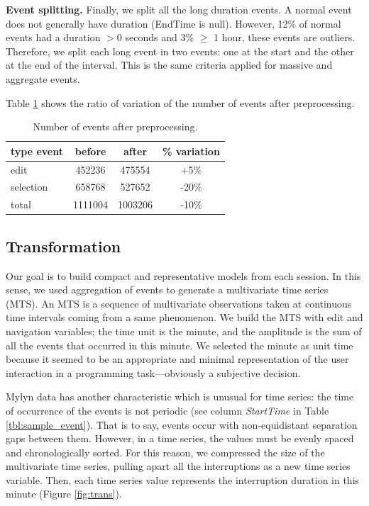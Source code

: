 \documentclass[conference]{IEEEtran}
\begin{document}
\textbf{Event splitting.} Finally, we split all the long duration events. A normal event does not generally have duration (EndTime is null). However, 12\% of normal events  had a duration $> 0$ seconds and 3\% $\geq$ 1 hour, these events are outliers. Therefore, we split each long event in two events: one at the start and the other at the end of the interval. This is the same criteria applied for massive and aggregate events.

 Table \ref{tbl:mass_events} shows the ratio of variation of the number of events after preprocessing.
 
 \begin{table}[hb!]
 \renewcommand{\arraystretch}{1.3}
 \caption{Number of events after preprocessing.}
 \label{tbl:mass_events}
 \centering
 \begin{tabular}{l | c | c | c } 
   type event & before & after & \% variation  \\  
   \hline 
   edit &	 452236 & 475554 &	+5\%   \\
   selection &	658768 & 527652 & -20\%   \\
   \hline
   total & 1111004 & 1003206 & -10\%  \\
 \end{tabular}
 \end{table}

\subsection{Transformation}
Our goal is to build compact and representative models from each session. In this sense, we used aggregation of events to generate a multivariate time series (MTS). An MTS is a sequence of multivariate observations taken at continuous time intervals coming from a same phenomenon. We build the MTS with edit and navigation variables; the time unit is the minute, and the amplitude is the sum of all the events that occurred in this minute. We selected the minute as unit time because it seemed to be an appropriate and minimal representation of the user interaction in a programming task---obviously a subjective decision. 


Mylyn data has another characteristic which is unusual for time series: the time of occurrence of the events is not periodic (see column \textit{StartTime} in Table \ref{tbl:sample_event}). That is to say, events occur with non-equidistant separation gaps between them. However, in a time series, the values must be evenly spaced and chronologically sorted. For this reason, we compressed the size of the multivariate time series, pulling apart all the interruptions as a new time series variable. Then, each time series value represents the interruption duration in this minute (Figure \ref{fig:trans}). 
\end{document}
